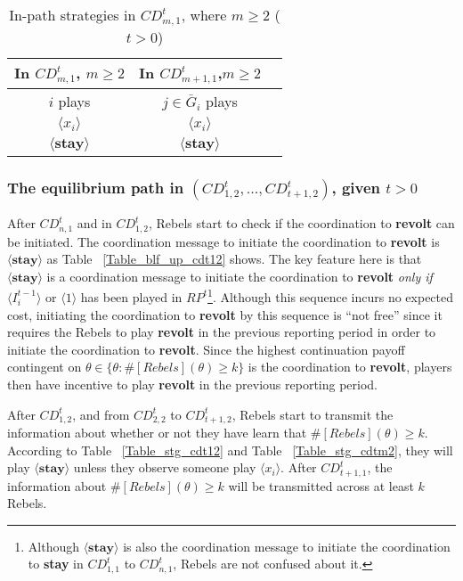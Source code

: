 \documentclass[12pt,letter]{article}
\theoremstyle{definition}
\theoremstyle{remark}
\theoremstyle{claim}
\begin{document}
\begin{table}[ht]
\caption{In-path strategies in $CD^t_{m,1}$, where $m\geq 2$ ($t>0$)}
\label{Table_stg_cdtm1}
\begin{center}
\begin{tabular}{c c c}
In $CD^t_{m,1}$, $m\geq 2$ 	 	&  	In $CD^t_{m+1,1}$,$m\geq 2$		& 	\\
\hline
\hline
$i$ plays 		  							&  $j\in \bar{G}_{i}$ plays  								& \\
\hline
$\langle x_i \rangle$ 	& 	$\langle x_i \rangle$	    &  \\
$\langle \textbf{stay} \rangle$		&  $\langle \textbf{stay} \rangle$	&  \\

\end{tabular}
\end{center}
\end{table}


\subsubsection*{The equilibrium path in $(CD^t_{1,2},...,CD^t_{t+1,2})$, given $t>0$}
After $CD^t_{n,1}$ and in $CD^t_{1,2}$, Rebels start to check if the coordination to \textbf{revolt} can be initiated. The coordination message to initiate the coordination to \textbf{revolt} is $\langle \textbf{stay} \rangle$ as Table ~\ref{Table_blf_up_cdt12} shows. The key feature here is that $\langle \textbf{stay} \rangle$ is a coordination message to initiate the coordination to \textbf{revolt} \textit{only if} $\langle  {I^{t-1}_i} \rangle$ or $\langle 1 \rangle$ has been played in $RP^t$\footnote{Although $\langle \textbf{stay} \rangle$ is also the coordination message to initiate the coordination to \textbf{stay} in $CD^t_{1,1}$ to $CD^t_{n,1}$, Rebels are not confused about it.}. Although this sequence incurs no expected cost, initiating the coordination to \textbf{revolt} by this sequence is ``not free'' since it requires the Rebels to play \textbf{revolt} in the previous reporting period in order to initiate the coordination to \textbf{revolt}. Since the highest continuation payoff contingent on $\theta\in\{\theta:\#[Rebels](\theta)\geq k\}$ is the coordination to \textbf{revolt}, players then have incentive to play \textbf{revolt} in the previous reporting period.



After $CD^t_{1,2}$, and from $CD^t_{2,2}$ to $CD^t_{t+1,2}$, Rebels start to transmit the information about whether or not they have learn that $\#[Rebels](\theta)\geq k$. According to Table ~\ref{Table_stg_cdt12} and Table ~\ref{Table_stg_cdtm2}, they will play $\langle \textbf{stay} \rangle$ unless they observe someone play $\langle x_i \rangle$. After $CD^t_{{t+1},1}$, the information about $\#[Rebels](\theta)\geq k$ will be transmitted across at least $k$ Rebels. 
\end{document}
